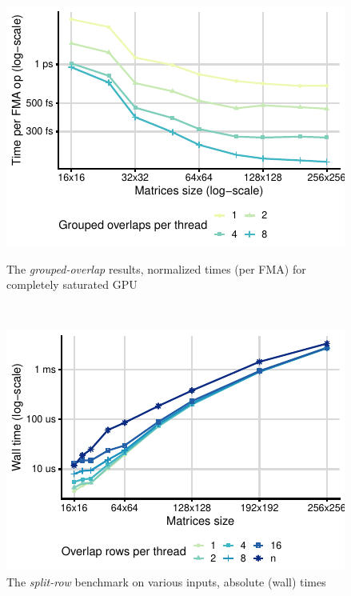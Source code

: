 \begin{figure}[ht]
	\begin{minipage}{.48\textwidth}
		\centering
		\includegraphics[width=\textwidth]{crosscorr/plots/one-to-one/grouped-overlap.pdf}
		\caption{The \emph{grouped-overlap} results, normalized times (per FMA) for completely saturated GPU}
		\label{fig:grouped-overlap}
	\end{minipage}%
	\begin{minipage}{.03\textwidth}~
	\end{minipage}
	\begin{minipage}{.48\textwidth}
		\centering
		\includegraphics[width=\textwidth]{crosscorr/plots/one-to-one/split-row.pdf}
		\caption{The \emph{split-row} benchmark on various inputs, absolute (wall) times}
		\label{fig:split-row}
	\end{minipage}
\end{figure}

